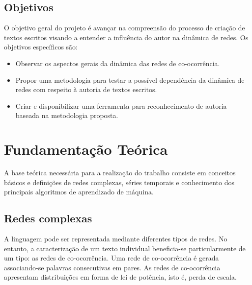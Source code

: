 \documentclass[a4paper,openright,12pt]{report} %
\begin{document}
\section{Objetivos}

O objetivo geral do projeto \'e avan\c car na compreens\~ao do processo de cria\c c\~ao de textos escritos visando a entender a influ\^encia do autor na din\^amica de redes. Os objetivos espec\'ificos s\~ao:

\begin{itemize}
\item Observar os aspectos gerais da din\^amica das redes de co-ocorr\^encia.
\item Propor uma metodologia para testar a poss\'ivel depend\^encia da din\^amica de redes com respeito \`a autoria de textos escritos.
\item Criar e disponibilizar uma ferramenta para reconhecimento de autoria baseada na metodologia proposta.
\end{itemize}



\chapter{Fundamenta\c c\~ao Te\'orica} \label{teoria}

A base te\'orica necess\'aria para a realiza\c c\~ao do trabalho consiste em conceitos b\'asicos e defini\c c\~oes de redes complexas, s\'eries temporais e conhecimento dos principais algoritmos de aprendizado de m\'aquina.\\


\section{Redes complexas}



A linguagem pode ser representada mediante diferentes tipos de redes. No entanto, a caracteriza\c c\~ao de um texto individual beneficia-se particularmente de um tipo: as redes de co-ocorr\^encia. Uma rede de co-ocorr\^encia \'e gerada associando-se palavras consecutivas em pares. As redes de co-ocorr\^encia apresentam distribui\c c\~oes em forma de lei de pot\^encia, isto \'e, perda de escala.\\
\end{document}
